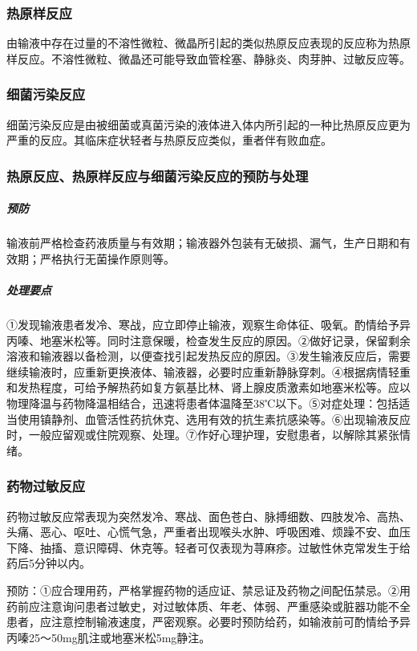 \subsubsection{热原样反应}

由输液中存在过量的不溶性微粒、微晶所引起的类似热原反应表现的反应称为热原样反应。不溶性微粒、微晶还可能导致血管栓塞、静脉炎、肉芽肿、过敏反应等。

\subsubsection{细菌污染反应}

细菌污染反应是由被细菌或真菌污染的液体进入体内所引起的一种比热原反应更为严重的反应。其临床症状轻者与热原反应类似，重者伴有败血症。

\subsubsection{热原反应、热原样反应与细菌污染反应的预防与处理}

\subparagraph{预防}

输液前严格检查药液质量与有效期；输液器外包装有无破损、漏气，生产日期和有效期；严格执行无菌操作原则等。

\subparagraph{处理要点}

①发现输液患者发冷、寒战，应立即停止输液，观察生命体征、吸氧。酌情给予异丙嗪、地塞米松等。同时注意保暖，检查发生反应的原因。②做好记录，保留剩余溶液和输液器以备检测，以便查找引起发热反应的原因。③发生输液反应后，需要继续输液时，应重新更换液体、输液器，必要时应重新静脉穿刺。④根据病情轻重和发热程度，可给予解热药如复方氨基比林、肾上腺皮质激素如地塞米松等。应以物理降温与药物降温相结合，迅速将患者体温降至38℃以下。⑤对症处理：包括适当使用镇静剂、血管活性药抗休克、选用有效的抗生素抗感染等。⑥出现输液反应时，一般应留观或住院观察、处理。⑦作好心理护理，安慰患者，以解除其紧张情绪。

\subsubsection{药物过敏反应}

药物过敏反应常表现为突然发冷、寒战、面色苍白、脉搏细数、四肢发冷、高热、头痛、恶心、呕吐、心慌气急，严重者出现喉头水肿、呼吸困难、烦躁不安、血压下降、抽搐、意识障碍、休克等。轻者可仅表现为荨麻疹。过敏性休克常发生于给药后5分钟以内。

预防：①应合理用药，严格掌握药物的适应证、禁忌证及药物之间配伍禁忌。②用药前应注意询问患者过敏史，对过敏体质、年老、体弱、严重感染或脏器功能不全患者，应注意控制输液速度，严密观察。必要时预防给药，如输液前可酌情给予异丙嗪25～50mg肌注或地塞米松5mg静注。

